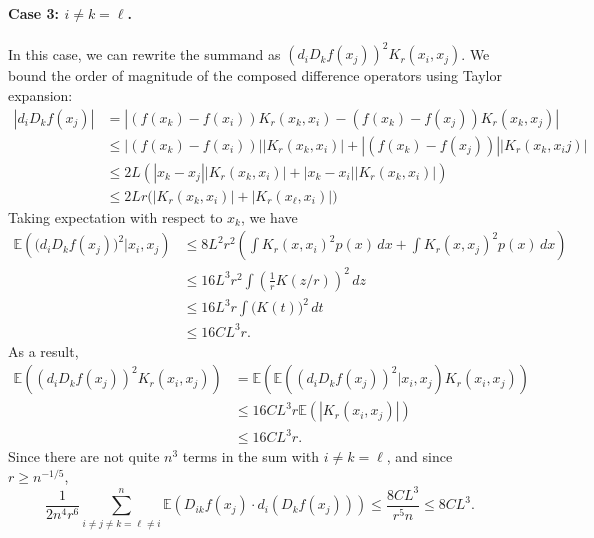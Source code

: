 \documentclass{article}
\newcommand{\abs}[1]{\left \lvert #1 \right \rvert}
\newcommand{\1}{\mathbf{1}}
\newcommand{\Ebb}{\mathbb{E}}
\theoremstyle{alden}
\theoremstyle{aldenthm}
\theoremstyle{definition}
\theoremstyle{remark}
\begin{document}
\paragraph{Case 3: $i \neq k = \ell$.}
In this case, we can rewrite the summand as $(d_{i}D_kf(x_j))^2K_r(x_i,x_j)$. We bound the order of magnitude of the composed difference operators using Taylor expansion:
\begin{align*}
\abs{d_{i}D_kf(x_j)} & = \abs{(f(x_k) - f(x_i))K_r(x_k,x_i) - (f(x_k) - f(x_j))K_r(x_k,x_j)} \\
& \leq \abs{(f(x_k) - f(x_i))}\abs{K_r(x_k,x_i)} + \abs{(f(x_k) - f(x_j))}\abs{K_r(x_k,x_ij)} \\
& \leq 2L\left(\abs{x_k - x_j} \abs{K_r(x_k,x_i)} + \abs{x_k - x_i} \abs{K_r(x_k,x_i)}\right) \\
& \leq 2Lr \bigl(\abs{K_r(x_k,x_i)} + \abs{K_r(x_{\ell},x_i)}\bigr)
\end{align*}
Taking expectation with respect to $x_k$, we have
\begin{align*}
\Ebb(\bigl(d_{i}D_kf(x_j)\bigr)^2|x_i,x_j) & \leq 8L^2r^2\left(\int K_r(x,x_i)^2 p(x)\,dx + \int K_r(x,x_j)^2 p(x)\,dx\right) \\
& \leq 16L^3r^{2} \int \left(\frac{1}{r}K(z/r)\right)^2 \,dz \tag{$p \in C^2(L)$} \\
& \leq 16L^3r \int \bigl(K(t)\bigr)^2 \,dt \tag{change of variables} \\
& \leq 16CL^3r. \tag{$K$ compactly supported and bounded}
\end{align*}
As a result, 
\begin{align*}
\Ebb((d_{i}D_kf(x_j))^2K_r(x_i,x_j)) & = \Ebb(\Ebb((d_{i}D_kf(x_j))^2|x_i,x_j)K_r(x_i,x_j)) \\
& \leq 16CL^3r\Ebb(\abs{K_r(x_i,x_j)}) \\
& \leq 16CL^3r.
\end{align*}
Since there are not quite $n^3$ terms in the sum with $i \neq k = \ell$, and since $r \geq n^{-1/5}$, 
\begin{equation*}
\frac{1}{2n^4r^6}\sum_{i \neq j \neq k = \ell \neq i}^{n} \Ebb(D_{ik}f(x_j) \cdot d_i(D_kf(x_j))) \leq \frac{8 C L^3}{r^5n} \leq 8 C L^3.
\end{equation*}
\end{document}
